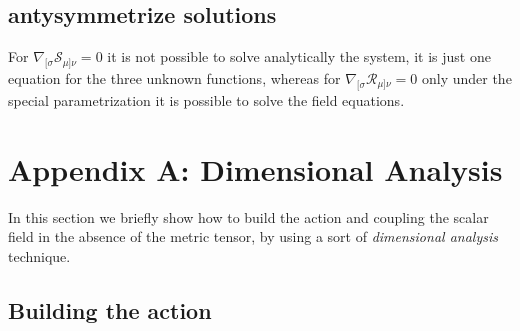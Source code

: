 \documentclass[10pt,a4paper]{article}
\begin{document}
\subsection{antysymmetrize solutions}

For $\nabla_{[\sigma} \mathcal{S}_{\mu]\nu} = 0$ it is not possible to solve analytically the system, it is just one equation for the three unknown functions, 
whereas for $\nabla_{[\sigma} \mathcal{R}_{\mu]\nu} = 0$ only under the special parametrization it is possible to solve the field equations.

\section{Appendix A: Dimensional Analysis}

In this section we briefly show how to build the action and coupling the scalar field in the absence of the metric tensor, by using a sort of
\textit{dimensional analysis} technique.

\subsection{Building the action}
\end{document}
